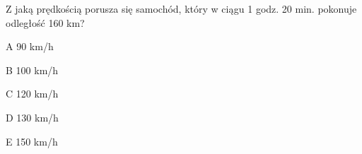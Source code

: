 \begin{tresc}
Z jaką prędkością porusza się samochód, który w ciągu 1 godz. 20 min. pokonuje odległość 160 km?
\end{tresc}
\begin{wariant}{A} 90 km/h \end{wariant}
\begin{wariant}{B} 100 km/h \end{wariant}
\begin{wariant}{C} 120 km/h \end{wariant}
\begin{wariant}{D} 130 km/h \end{wariant}
\begin{wariant}{E} 150 km/h \end{wariant}
